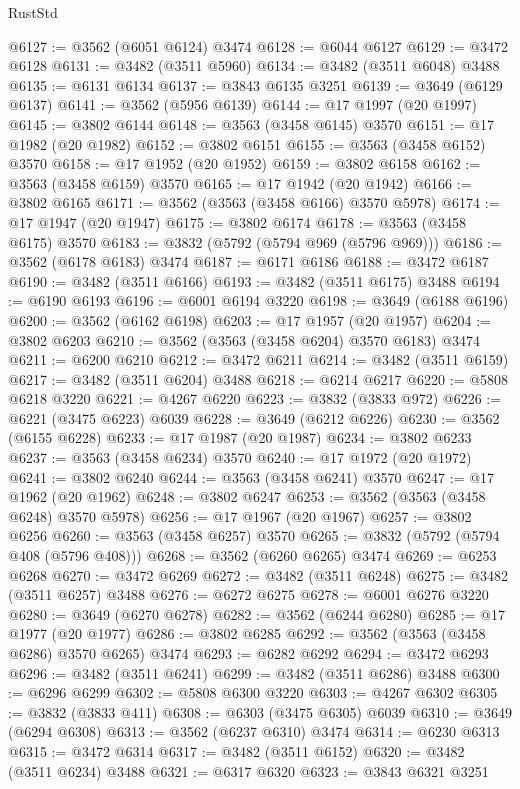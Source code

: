 \begin{lexlean}{RustStd}
\begin{coremodule}
{\begin{coremodule}
{{{{{{{{{{{{{{{{{{{{{{{{{{{{{{{{{{{{{{{{{{{{{@6127 := @3562 (@6051 @6124) @3474
@6128 := @6044 @6127
@6129 := @3472 @6128
@6131 := @3482 (@3511 @5960)
@6134 := @3482 (@3511 @6048) @3488
@6135 := @6131 @6134
@6137 := @3843 @6135 @3251
@6139 := @3649 (@6129 @6137)
@6141 := @3562 (@5956 @6139)
@6144 := @17 @1997 (@20 @1997)
@6145 := @3802 @6144
@6148 := @3563 (@3458 @6145) @3570
@6151 := @17 @1982 (@20 @1982)
@6152 := @3802 @6151
@6155 := @3563 (@3458 @6152) @3570
@6158 := @17 @1952 (@20 @1952)
@6159 := @3802 @6158
@6162 := @3563 (@3458 @6159) @3570
@6165 := @17 @1942 (@20 @1942)
@6166 := @3802 @6165
@6171 := @3562 (@3563 (@3458 @6166) @3570 @5978)
@6174 := @17 @1947 (@20 @1947)
@6175 := @3802 @6174
@6178 := @3563 (@3458 @6175) @3570
@6183 := @3832 (@5792 (@5794 @969 (@5796 @969)))
@6186 := @3562 (@6178 @6183) @3474
@6187 := @6171 @6186
@6188 := @3472 @6187
@6190 := @3482 (@3511 @6166)
@6193 := @3482 (@3511 @6175) @3488
@6194 := @6190 @6193
@6196 := @6001 @6194 @3220
@6198 := @3649 (@6188 @6196)
@6200 := @3562 (@6162 @6198)
@6203 := @17 @1957 (@20 @1957)
@6204 := @3802 @6203
@6210 := @3562 (@3563 (@3458 @6204) @3570 @6183) @3474
@6211 := @6200 @6210
@6212 := @3472 @6211
@6214 := @3482 (@3511 @6159)
@6217 := @3482 (@3511 @6204) @3488
@6218 := @6214 @6217
@6220 := @5808 @6218 @3220
@6221 := @4267 @6220
@6223 := @3832 (@3833 @972)
@6226 := @6221 (@3475 @6223) @6039
@6228 := @3649 (@6212 @6226)
@6230 := @3562 (@6155 @6228)
@6233 := @17 @1987 (@20 @1987)
@6234 := @3802 @6233
@6237 := @3563 (@3458 @6234) @3570
@6240 := @17 @1972 (@20 @1972)
@6241 := @3802 @6240
@6244 := @3563 (@3458 @6241) @3570
@6247 := @17 @1962 (@20 @1962)
@6248 := @3802 @6247
@6253 := @3562 (@3563 (@3458 @6248) @3570 @5978)
@6256 := @17 @1967 (@20 @1967)
@6257 := @3802 @6256
@6260 := @3563 (@3458 @6257) @3570
@6265 := @3832 (@5792 (@5794 @408 (@5796 @408)))
@6268 := @3562 (@6260 @6265) @3474
@6269 := @6253 @6268
@6270 := @3472 @6269
@6272 := @3482 (@3511 @6248)
@6275 := @3482 (@3511 @6257) @3488
@6276 := @6272 @6275
@6278 := @6001 @6276 @3220
@6280 := @3649 (@6270 @6278)
@6282 := @3562 (@6244 @6280)
@6285 := @17 @1977 (@20 @1977)
@6286 := @3802 @6285
@6292 := @3562 (@3563 (@3458 @6286) @3570 @6265) @3474
@6293 := @6282 @6292
@6294 := @3472 @6293
@6296 := @3482 (@3511 @6241)
@6299 := @3482 (@3511 @6286) @3488
@6300 := @6296 @6299
@6302 := @5808 @6300 @3220
@6303 := @4267 @6302
@6305 := @3832 (@3833 @411)
@6308 := @6303 (@3475 @6305) @6039
@6310 := @3649 (@6294 @6308)
@6313 := @3562 (@6237 @6310) @3474
@6314 := @6230 @6313
@6315 := @3472 @6314
@6317 := @3482 (@3511 @6152)
@6320 := @3482 (@3511 @6234) @3488
@6321 := @6317 @6320
@6323 := @3843 @6321 @3251
}}}}}}}}}}}}}}}}}}}}}}}}}}}}}}}}}}}}}}}}}}}}}
\end{coremodule}}
\end{coremodule}
\end{lexlean}

